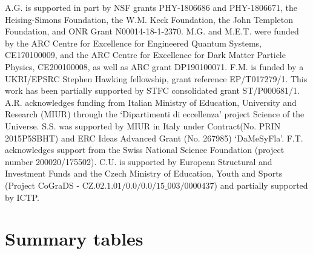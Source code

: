 \documentclass[11pt,a4paper]{article}
\begin{document}
A.G. is supported in part by NSF grants PHY-1806686 and PHY-1806671, the Heising-Simons Foundation, the W.M. Keck Foundation, the John Templeton Foundation, and ONR Grant N00014-18-1-2370.
M.G. and M.E.T. were funded by the ARC Centre for Excellence for Engineered Quantum Systems, CE170100009, and the ARC Centre for Excellence for Dark Matter Particle Physics, CE200100008, as well as ARC grant DP190100071. F.M. is funded by a UKRI/EPSRC Stephen Hawking fellowship, grant reference EP/T017279/1. This work has been partially supported by STFC consolidated grant ST/P000681/1. A.R. acknowledges funding from Italian Ministry of Education, University and Research (MIUR) through the `Dipartimenti di eccellenza' project Science of the Universe. S.S.  was supported by MIUR in Italy under Contract(No. PRIN 2015P5SBHT) and ERC Ideas Advanced Grant (No. 267985) `DaMeSyFla'. F.T. acknowledges support from the Swiss National Science Foundation (project number 200020/175502). C.U. is supported by European Structural and Investment Funds and the Czech Ministry of Education, Youth and Sports (Project CoGraDS - CZ.$02.1.01/0.0/0.0/15\_003/0000437$) and partially supported by ICTP.

\appendix

\section{Summary tables}
\label{sec:SummaryTable}
\end{document}

